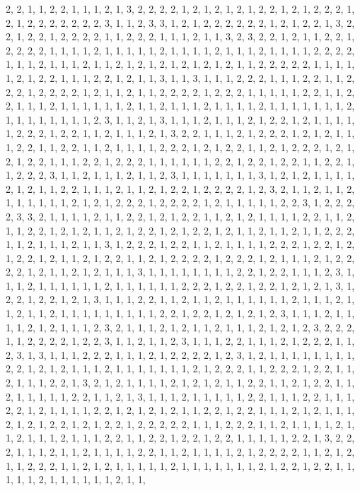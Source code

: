 \documentclass[
]{article}
\begin{document}
\begin{Schunk}
\begin{Soutput}
2, 2, 1, 1, 2, 2, 1, 1, 1, 2, 1, 3, 2, 2, 2, 2, 1, 2, 1, 2, 1, 2, 1, 2, 2, 1, 2, 1, 2, 2, 2, 1, 2, 1, 2, 2, 2, 2, 2, 2, 2, 3, 1, 1, 2, 3, 3, 1, 2, 1, 2, 2, 2, 2, 2, 2, 1, 2, 1, 2, 2, 1, 3, 2, 2, 1, 2, 2, 1, 2, 2, 2, 2, 1, 1, 2, 2, 2, 1, 1, 1, 2, 1, 1, 3, 2, 3, 2, 2, 1, 2, 1, 1, 2, 2, 1, 2, 2, 2, 2, 1, 1, 1, 1, 2, 1, 1, 1, 1, 1, 2, 1, 1, 1, 1, 2, 1, 1, 1, 2, 1, 1, 1, 1, 2, 2, 2, 2, 1, 1, 1, 2, 1, 1, 1, 2, 1, 1, 2, 1, 2, 1, 2, 1, 2, 1, 2, 1, 2, 1, 1, 2, 2, 2, 2, 2, 1, 1, 1, 1, 1, 2, 1, 2, 2, 1, 1, 1, 2, 2, 1, 2, 1, 1, 3, 1, 1, 3, 1, 1, 1, 2, 2, 2, 1, 1, 1, 2, 2, 1, 1, 2, 2, 2, 1, 2, 2, 2, 2, 1, 2, 1, 1, 2, 1, 1, 2, 2, 2, 2, 1, 2, 2, 2, 1, 1, 1, 1, 1, 2, 2, 1, 1, 2, 2, 1, 1, 1, 2, 1, 1, 1, 1, 1, 1, 2, 1, 1, 2, 1, 1, 1, 2, 1, 1, 1, 1, 2, 1, 1, 1, 1, 1, 1, 1, 2, 1, 1, 1, 1, 1, 1, 1, 1, 2, 3, 1, 1, 2, 1, 3, 1, 1, 1, 2, 1, 1, 1, 2, 1, 2, 2, 1, 2, 1, 1, 1, 1, 1, 2, 2, 2, 1, 2, 2, 1, 1, 2, 1, 1, 1, 2, 1, 3, 2, 2, 1, 1, 1, 2, 1, 2, 2, 2, 1, 2, 1, 2, 1, 1, 1, 2, 2, 1, 1, 2, 2, 1, 1, 2, 1, 1, 1, 1, 2, 2, 2, 1, 2, 1, 2, 2, 1, 1, 2, 1, 2, 2, 2, 1, 2, 1, 2, 1, 2, 2, 1, 1, 1, 2, 2, 1, 2, 2, 2, 1, 1, 1, 1, 1, 1, 2, 2, 1, 2, 2, 1, 2, 2, 1, 1, 2, 2, 1, 1, 2, 2, 2, 3, 1, 1, 2, 1, 1, 1, 2, 1, 1, 2, 3, 1, 1, 1, 1, 1, 1, 1, 3, 1, 2, 1, 2, 1, 1, 1, 1, 2, 1, 2, 1, 1, 2, 2, 1, 1, 1, 2, 1, 1, 2, 1, 2, 2, 1, 2, 2, 2, 2, 1, 2, 3, 2, 1, 1, 2, 1, 1, 2, 1, 1, 1, 1, 1, 1, 2, 1, 2, 1, 2, 2, 2, 1, 2, 2, 2, 2, 1, 2, 1, 1, 1, 1, 1, 2, 2, 3, 1, 2, 2, 2, 2, 3, 3, 2, 1, 1, 1, 1, 2, 1, 1, 2, 2, 1, 2, 1, 2, 2, 1, 1, 2, 1, 2, 1, 1, 1, 1, 2, 2, 1, 1, 2, 1, 1, 2, 2, 1, 2, 1, 2, 1, 1, 2, 1, 2, 2, 1, 2, 1, 2, 2, 1, 2, 1, 1, 2, 1, 1, 2, 1, 1, 2, 2, 2, 1, 1, 2, 1, 1, 1, 2, 1, 1, 3, 1, 2, 2, 2, 1, 2, 2, 1, 1, 2, 1, 1, 1, 1, 2, 2, 2, 1, 2, 2, 1, 2, 1, 2, 2, 1, 2, 1, 1, 2, 1, 2, 2, 1, 1, 2, 1, 2, 2, 2, 2, 1, 2, 2, 2, 1, 2, 1, 1, 1, 2, 1, 2, 2, 2, 2, 1, 2, 1, 1, 2, 1, 2, 1, 1, 1, 3, 1, 1, 1, 1, 1, 1, 1, 1, 2, 2, 1, 2, 2, 1, 1, 1, 2, 3, 1, 1, 1, 2, 1, 1, 1, 1, 1, 1, 2, 1, 1, 1, 1, 1, 1, 2, 2, 2, 1, 2, 2, 1, 2, 2, 1, 2, 1, 2, 1, 3, 1, 2, 2, 1, 2, 2, 1, 2, 1, 3, 1, 1, 1, 2, 2, 1, 1, 2, 1, 1, 2, 1, 1, 1, 1, 1, 1, 2, 1, 1, 1, 2, 1, 1, 2, 1, 1, 2, 1, 1, 1, 1, 1, 1, 1, 1, 1, 2, 2, 1, 2, 2, 1, 2, 1, 2, 1, 2, 3, 1, 1, 1, 2, 1, 1, 1, 1, 2, 1, 2, 1, 1, 1, 2, 3, 2, 1, 1, 1, 2, 1, 2, 1, 1, 2, 1, 1, 1, 2, 1, 2, 1, 2, 3, 2, 2, 2, 1, 1, 2, 2, 2, 2, 1, 2, 2, 3, 1, 1, 2, 1, 1, 2, 3, 1, 1, 1, 2, 2, 1, 1, 1, 2, 1, 2, 2, 2, 1, 1, 2, 3, 1, 3, 1, 1, 1, 2, 2, 2, 1, 1, 1, 2, 1, 2, 2, 2, 2, 1, 2, 3, 1, 2, 1, 1, 1, 1, 1, 1, 1, 1, 2, 2, 1, 2, 1, 2, 1, 1, 1, 2, 1, 1, 1, 1, 1, 1, 1, 2, 1, 2, 2, 2, 1, 1, 2, 2, 2, 1, 2, 2, 1, 1, 2, 1, 1, 1, 2, 2, 1, 3, 2, 1, 2, 1, 1, 1, 1, 2, 1, 2, 1, 2, 1, 1, 2, 2, 1, 1, 2, 1, 2, 2, 1, 1, 2, 1, 1, 1, 1, 1, 2, 2, 1, 1, 2, 1, 3, 1, 1, 1, 2, 1, 1, 1, 1, 1, 2, 2, 1, 1, 1, 2, 2, 1, 1, 1, 2, 2, 1, 2, 1, 1, 1, 1, 2, 2, 1, 2, 1, 2, 1, 2, 1, 1, 2, 2, 1, 2, 2, 1, 1, 1, 2, 1, 2, 1, 1, 1, 2, 1, 2, 1, 2, 2, 1, 2, 1, 2, 2, 1, 2, 2, 2, 2, 2, 1, 1, 1, 2, 2, 2, 1, 1, 2, 1, 1, 1, 1, 2, 1, 1, 2, 1, 1, 1, 2, 1, 1, 1, 2, 2, 1, 1, 2, 2, 1, 2, 2, 1, 2, 2, 1, 1, 1, 1, 1, 2, 2, 1, 3, 2, 2, 2, 1, 1, 1, 2, 1, 1, 2, 1, 1, 1, 1, 2, 2, 1, 1, 2, 1, 1, 1, 1, 2, 1, 2, 2, 2, 2, 1, 1, 2, 1, 2, 1, 1, 2, 2, 2, 1, 1, 2, 1, 2, 1, 1, 1, 1, 1, 2, 1, 1, 1, 1, 1, 1, 1, 2, 1, 2, 2, 1, 2, 2, 1, 1, 1, 1, 1, 2, 1, 1, 1, 1, 1, 1, 2, 1, 1, 
\end{Soutput}
\end{Schunk}
\end{document}
